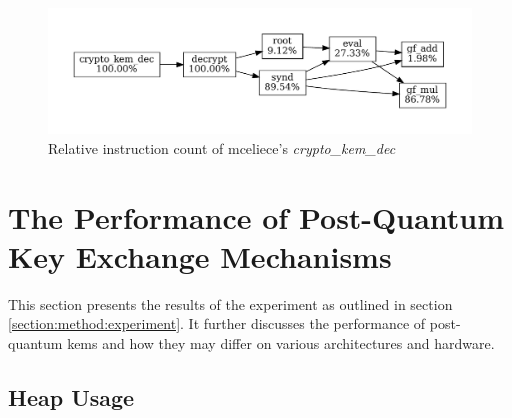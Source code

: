 \begin{figure}[H]
    \centering
    \includegraphics[scale=0.5]{chapters/results/hot-paths/classic-mceliece/8192128/crypto_kem_dec.pdf}
    \caption{Relative instruction count of \gls{mceliece}'s \textit{crypto\_kem\_dec}}
    \label{figure:result:hot-paths:classic-mceliece:crypto_kem_dec}
\end{figure}



\section{The Performance of Post-Quantum Key Exchange Mechanisms}

This section presents the results of the experiment as outlined in section \ref{section:method:experiment}. It further discusses the performance of \gls{post-quantum} \glspl{kem} and how they may differ on various architectures and hardware.

\subsection{Heap Usage}

